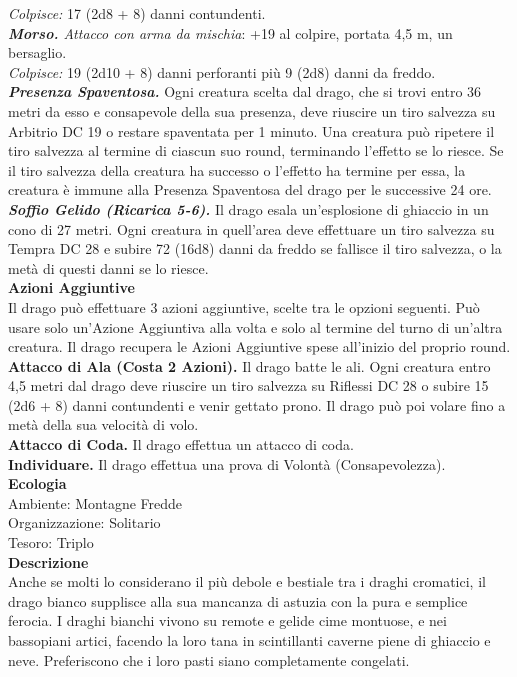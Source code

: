 \begin{multicols}{2}
\emph{Colpisce:} 17 (2d8 + 8) danni contundenti. \\
\emph{\textbf{Morso.} Attacco con arma da mischia}: +19 al colpire, portata 4,5 m, un bersaglio.\\
\emph{Colpisce:} 19 (2d10 + 8) danni perforanti più 9 (2d8) danni da freddo.\\
\emph{\textbf{Presenza Spaventosa.}} Ogni creatura scelta dal drago, che si trovi entro 36 metri da esso e consapevole della sua presenza, deve riuscire un tiro salvezza su Arbitrio DC  19 o restare spaventata per 1 minuto. Una creatura può ripetere il tiro salvezza al termine di ciascun suo round, terminando l'effetto se lo riesce. Se il tiro salvezza della creatura ha successo o l'effetto ha termine per essa, la creatura è immune alla Presenza Spaventosa del drago per le successive 24 ore.\\
\emph{\textbf{Soffio Gelido (Ricarica 5-6).}} Il drago esala un'esplosione di ghiaccio in un cono di 27 metri. Ogni creatura in quell'area deve effettuare un tiro salvezza su Tempra DC  28 e subire 72 (16d8) danni da freddo se fallisce il tiro salvezza, o la metà di questi danni se lo riesce.\\
\textbf{Azioni Aggiuntive}\\
Il drago può effettuare 3 azioni aggiuntive, scelte tra le opzioni seguenti. Può usare solo un'Azione Aggiuntiva alla volta e solo al termine del turno di un'altra creatura. Il drago recupera le Azioni Aggiuntive spese all'inizio del proprio round.\\
\textbf{Attacco di Ala (Costa 2 Azioni).} Il drago batte le ali. Ogni creatura entro 4,5 metri dal drago deve riuscire un tiro salvezza su Riflessi DC  28 o subire 15 (2d6 + 8) danni contundenti e venir gettato prono. Il drago può poi volare fino a metà della sua velocità di volo.\\
\textbf{Attacco di Coda.} Il drago effettua un attacco di coda.\\
\textbf{Individuare.} Il drago effettua una prova di Volontà (Consapevolezza).\\
\textbf{Ecologia}\\
Ambiente: Montagne Fredde\\
Organizzazione: Solitario\\
Tesoro: Triplo\\
\textbf{Descrizione}\\
Anche se molti lo considerano il più debole e bestiale tra i draghi cromatici, il drago bianco supplisce alla sua mancanza di astuzia con la pura e semplice ferocia. I draghi bianchi vivono su remote e gelide cime montuose, e nei bassopiani artici, facendo la loro tana in scintillanti caverne piene di ghiaccio e neve. Preferiscono che i loro pasti siano completamente congelati.\\



\end{multicols}
